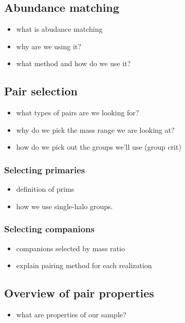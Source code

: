 \documentclass[twocolumn]{aastex631}
\begin{document}
\subsection{Abundance matching} \label{sec:methods-am}
    \begin{itemize}
        \item what is abudance matching
        \item why are we using it?
        \item what method and how do we use it? 
    \end{itemize} 

\subsection{Pair selection}\label{sec:methods-pairs}
    \begin{itemize}
        \item what types of pairs are we looking for? 
        \item why do we pick the mass range we are looking at?
        \item how do we pick out the groups we'll use (group crit)
    \end{itemize}
    \subsubsection{Selecting primaries}
            \begin{itemize}
                \item definition of prims
                \item how we use single-halo groups. 
            \end{itemize}
    \subsubsection{Selecting companions}
            \begin{itemize}
                \item companions selected by mass ratio
                \item explain pairing method for each realization
            \end{itemize}
    
\subsection{Overview of pair properties} \label{sec:methods-props}
    \begin{itemize}
        \item what are properties of our sample?
    \end{itemize}
\end{document}
